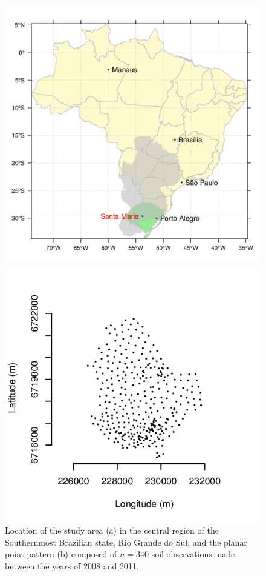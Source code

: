 \begin{figure}[!ht]
\centering
\begin{minipage}{0.6\textwidth}
\subcaption{}
\includegraphics[width=\textwidth]{fig/chap07-location}
\end{minipage}
\begin{minipage}{0.6\textwidth}
\subcaption{}
\includegraphics[width=\textwidth]{fig/chap07-ppp}
\end{minipage}
\caption[Location of the study area and the planar point pattern.]{Location of the study area (a) in the 
central region of the Southernmost Brazilian state, Rio Grande do Sul, and the planar point pattern (b) 
composed of $n = 340$ soil observations made between the years of \num{2008} and \num{2011}.}
\label{fig:chap07-chap07-location}
\end{figure}

